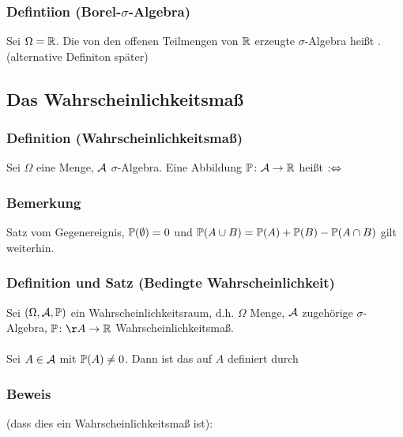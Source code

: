 \subsubsection{Defintiion (Borel-$\sigma$-Algebra)}
Sei $\Omega=\mathbb{R}$. Die von den offenen Teilmengen von $\mathbb{R}$ erzeugte $\sigma$-Algebra hei\ss{}t . (alternative Definiton sp\"ater)
\subsection{Das Wahrscheinlichkeitsma\ss{}}
\subsubsection{Definition (Wahrscheinlichkeitsma\ss{})}
Sei $\Omega$ eine Menge, $\mathcal{A}$ $\sigma$-Algebra. Eine Abbildung $\mathbb{P}\colon\mathcal{A}\to\mathbb{R}$ hei\ss{}t  $:\Leftrightarrow$
\subsubsection{Bemerkung}
Satz vom Gegenereignis, $\mathbb{P}(\emptyset)=0$ und $\mathbb{P}(A\cup B)=\mathbb{P}(A)+\mathbb{P}(B)-\mathbb{P}(A\cap B)$ gilt weiterhin.
\subsubsection{Definition und Satz (Bedingte Wahrscheinlichkeit)}
Sei $(\Omega,\mathcal{A},\mathbb{P})$ ein Wahrscheinlichkeitsraum, d.h. $\Omega$ Menge, $\mathcal{A}$ zugeh\"orige $\sigma$-Algebra, $\PP\colon\AA\to\RR$ Wahrscheinlichkeitsma\ss{}.
\\~\\
Sei $A\in\mathcal{A}$ mit $\mathbb{P}(A)\neq0$. Dann ist das auf $A$  definiert durch
\subsubsection{Beweis}
(dass dies ein Wahrscheinlichkeitsma\ss{} ist):
